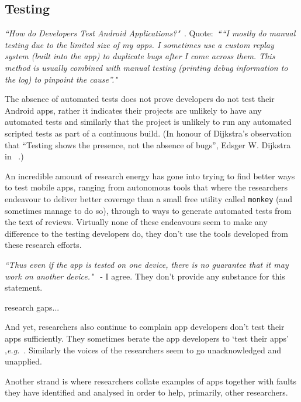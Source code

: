 \subsection{Testing}
\emph{``How do Developers Test Android Applications?"}~. Quote:~\emph{``“I mostly do manual testing due to the limited size of my apps. I sometimes use a custom replay system (built into the app) to duplicate bugs after I come across them. This method is usually combined with manual testing (printing debug information to the log) to pinpoint the cause”."}

The absence of automated tests does not prove developers do not test their Android apps, rather it indicates their projects are unlikely to have any automated tests and similarly that the project is unlikely to run any automated scripted tests as part of a continuous build. (In honour of Dijkstra's observation that ``Testing shows the presence, not the absence of bugs'', Edsger W. Dijkstra in ~\textcite[p. 16][]{randell1970_software_engineering_techniques_nato_dijkstra}.) %

An incredible amount of research energy has gone into trying to find better ways to test mobile apps, ranging from autonomous tools that where the researchers endeavour to deliver better coverage than a small free utility called \texttt{monkey} (and sometimes manage to do so), through to ways to generate automated tests from the text of reviews. Virtually none of these endeavours seem to make any difference to the testing developers do, they don't use the tools developed from these research efforts. 

\emph{``Thus even if the app is tested on one device, there is no guarantee that it may work on another device."}~\cite[p. 27]{nagappan2016_future_trends_in_sw_eng_for_mobile_apps} - I agree. They don't provide any substance for this statement.

research gaps...

And yet, researchers also continue to complain app developers don't test their apps sufficiently. They sometimes berate the app developers to `test their apps' ,\emph{e.g.}~\textcite{cruz2019_guess_what_test_your_app}.
Similarly the voices of the researchers seem to go unacknowledged and unapplied.

Another strand is where researchers collate examples of apps together with faults they have identified and analysed in order to help, primarily, other researchers. 

